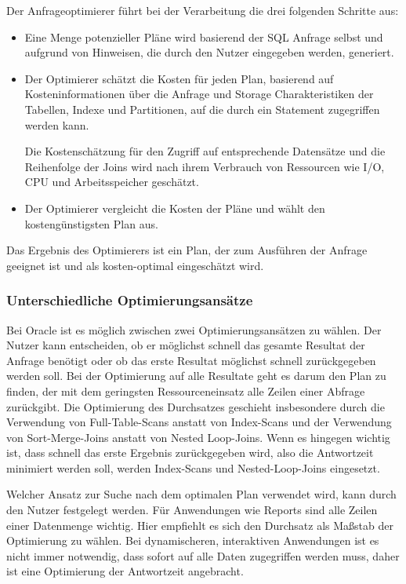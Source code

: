 Der Anfrageoptimierer führt bei der Verarbeitung die drei folgenden Schritte aus:

\begin{itemize}
\item Eine Menge potenzieller Pläne wird basierend der SQL Anfrage selbst und aufgrund von Hinweisen, die durch den Nutzer eingegeben werden, generiert.

\item Der Optimierer schätzt die Kosten für jeden Plan, basierend auf Kosteninformationen über die Anfrage und Storage Charakteristiken der Tabellen, Indexe und Partitionen, auf die durch ein Statement zugegriffen werden kann.

Die Kostenschätzung für den Zugriff auf entsprechende Datensätze und die Reihenfolge der Joins wird nach ihrem Verbrauch von Ressourcen wie I/O, CPU und Arbeitsspeicher geschätzt.

\item Der Optimierer vergleicht die Kosten der Pläne und wählt den kostengünstigsten Plan aus.
\end{itemize}

Das Ergebnis des Optimierers ist ein Plan, der zum Ausführen der Anfrage geeignet ist und als kosten-optimal eingeschätzt wird.


\subsubsection{Unterschiedliche Optimierungsansätze}



Bei Oracle ist es möglich zwischen zwei Optimierungsansätzen zu wählen. Der Nutzer kann entscheiden, ob er möglichst schnell das gesamte Resultat der Anfrage benötigt oder ob das erste Resultat möglichst schnell zurückgegeben werden soll. Bei der Optimierung auf alle Resultate geht es darum den Plan zu finden, der mit dem geringsten Ressourceneinsatz alle Zeilen einer Abfrage zurückgibt. Die Optimierung des Durchsatzes geschieht insbesondere durch die Verwendung von Full-Table-Scans anstatt von Index-Scans und der Verwendung von Sort-Merge-Joins anstatt von Nested Loop-Joins. Wenn es hingegen wichtig ist, dass schnell das erste Ergebnis zurückgegeben wird, also die Antwortzeit minimiert werden soll, werden Index-Scans und Nested-Loop-Joins eingesetzt.

Welcher Ansatz zur Suche nach dem optimalen Plan verwendet wird, kann durch den Nutzer festgelegt werden. Für Anwendungen wie Reports sind alle Zeilen einer Datenmenge wichtig. Hier empfiehlt es sich den Durchsatz als Maßstab der Optimierung zu wählen. Bei dynamischeren, interaktiven Anwendungen ist es nicht immer notwendig, dass sofort auf alle Daten zugegriffen werden muss, daher ist eine Optimierung der Antwortzeit angebracht.


